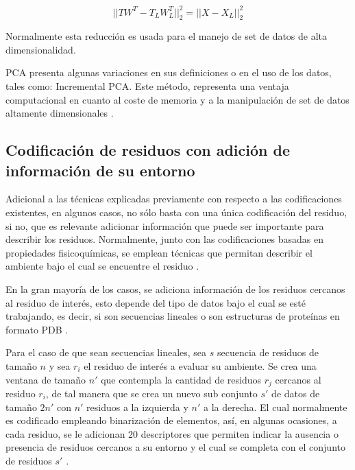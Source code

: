 \begin{equation}
	|| TW^{T} - T_{L}W_{L}^{T}||^{2}_{2} = ||X - X_{L}||_{2}^{2}
\end{equation}

Normalmente esta reducción es usada para el manejo de set de datos de alta dimensionalidad.

PCA presenta algunas variaciones en sus definiciones o en el uso de los datos, tales como: Incremental PCA. Este método, representa una ventaja computacional en cuanto al coste de memoria y a la manipulación de set de datos altamente dimensionales \cite{artac2002incremental}.

\subsection{Codificación de residuos con adición de información de su entorno}

Adicional a las técnicas explicadas previamente con respecto a las codificaciones existentes, en algunos casos, no sólo basta con una única codificación del residuo, si no, que es relevante adicionar información que puede ser importante para describir los residuos. Normalmente, junto con las codificaciones basadas en propiedades fisicoquímicas, se emplean técnicas que permitan describir el ambiente bajo el cual se encuentre el residuo \cite{masso2008accurate}.

En la gran mayoría de los casos, se adiciona información de los residuos cercanos al residuo de interés, esto depende del tipo de datos bajo el cual se esté trabajando, es decir, si son secuencias lineales o son estructuras de proteínas en formato PDB \cite{capriotti2008three, capriotti2005mutant2}. 

Para el caso de que sean secuencias lineales, sea $s$ secuencia de residuos de tamaño $n$ y sea $r_{i}$ el residuo de interés a evaluar su ambiente. Se crea una ventana de tamaño $n'$ que contempla la cantidad de residuos $r_j$ cercanos al residuo $r_{i}$, de tal manera que se crea un nuevo sub conjunto $s'$ de datos de tamaño $2n'$ con $n'$ residuos a la izquierda y $n'$ a la derecha. El cual normalmente es codificado empleando binarización de elementos, así, en algunas ocasiones, a cada residuo, se le adicionan 20 descriptores que permiten indicar la ausencia o presencia de residuos cercanos a su entorno y el cual se completa con el conjunto de residuos $s'$ \cite{capriotti2008three}.

